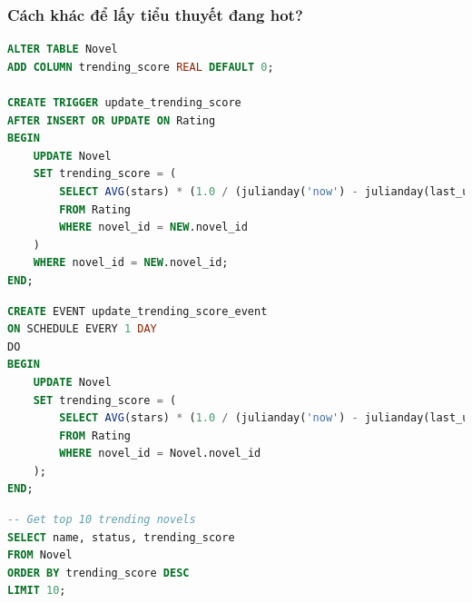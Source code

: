 \documentclass[12pt,aspectratio=169,handout]{beamer}
\begin{document}
\begin{frame}
\frametitle{Cách khác để lấy tiểu thuyết đang hot?}
\begin{lstlisting}[language=SQL, basicstyle=\footnotesize\ttfamily]
ALTER TABLE Novel
ADD COLUMN trending_score REAL DEFAULT 0;

CREATE TRIGGER update_trending_score
AFTER INSERT OR UPDATE ON Rating
BEGIN
    UPDATE Novel
    SET trending_score = (
        SELECT AVG(stars) * (1.0 / (julianday('now') - julianday(last_updated) + 1))
        FROM Rating
        WHERE novel_id = NEW.novel_id
    )
    WHERE novel_id = NEW.novel_id;
END;
\end{lstlisting}

\framebreak
\begin{lstlisting}[language=SQL, basicstyle=\small\ttfamily]
CREATE EVENT update_trending_score_event
ON SCHEDULE EVERY 1 DAY
DO
BEGIN
    UPDATE Novel
    SET trending_score = (
        SELECT AVG(stars) * (1.0 / (julianday('now') - julianday(last_updated) + 1))
        FROM Rating
        WHERE novel_id = Novel.novel_id
    );
END;
\end{lstlisting}

\framebreak
\begin{lstlisting}[language=SQL, basicstyle=\small\ttfamily]
-- Get top 10 trending novels
SELECT name, status, trending_score
FROM Novel
ORDER BY trending_score DESC
LIMIT 10;
\end{lstlisting}
\end{frame}
\end{document}
